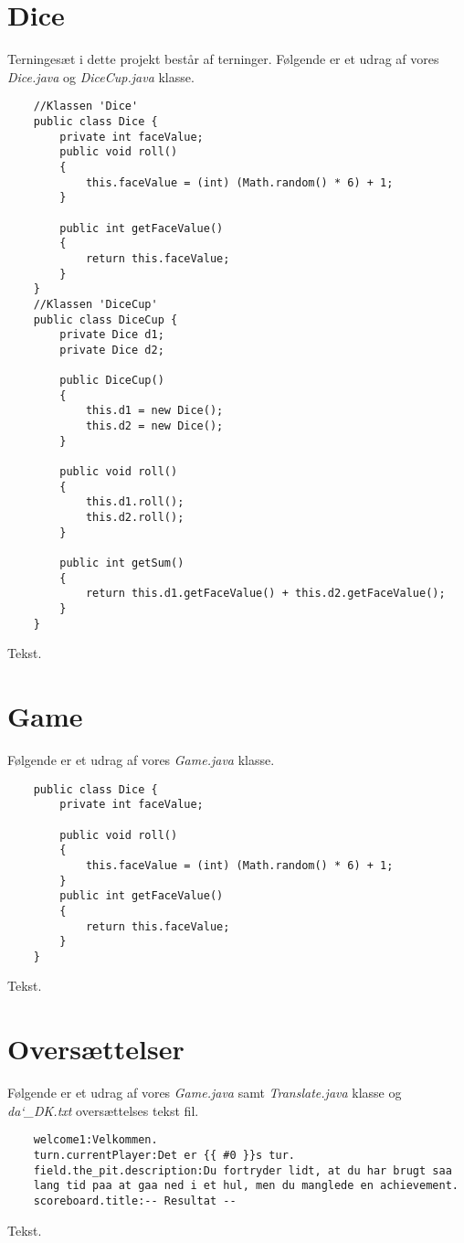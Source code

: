\section{Dice}
\noindent Terningesæt i dette projekt består af terninger. 
Følgende er et udrag af vores \textit{Dice.java} og \textit{DiceCup.java} klasse.\\
\begin{lstlisting}
    //Klassen 'Dice'    
    public class Dice {
        private int faceValue;
        public void roll()
        {
            this.faceValue = (int) (Math.random() * 6) + 1;
        }
    
        public int getFaceValue()
        {
            return this.faceValue;
        }
    }
    //Klassen 'DiceCup'
    public class DiceCup {
        private Dice d1;
        private Dice d2;

        public DiceCup()
        {
            this.d1 = new Dice();
            this.d2 = new Dice();
        }
    
        public void roll()
        {
            this.d1.roll();
            this.d2.roll();
        }
    
        public int getSum()
        {
            return this.d1.getFaceValue() + this.d2.getFaceValue();
        }
    }
\end{lstlisting}
\vspace{2ex}

\noindent Tekst.\\

\section{Game}
\noindent Følgende er et udrag af vores \textit{Game.java} klasse.\\
\begin{lstlisting}
    public class Dice {
        private int faceValue;

        public void roll()
        {
            this.faceValue = (int) (Math.random() * 6) + 1;
        }
        public int getFaceValue()
        {
            return this.faceValue;
        }
    }
\end{lstlisting}
\vspace{2ex}

\noindent Tekst.\\

\section{Oversættelser}
\noindent Følgende er et udrag af vores \textit{Game.java} samt \textit{Translate.java} klasse og \textit{da\char`_DK.txt} oversættelses tekst fil.\\
\begin{lstlisting}
    welcome1:Velkommen.
    turn.currentPlayer:Det er {{ #0 }}s tur.
    field.the_pit.description:Du fortryder lidt, at du har brugt saa
    lang tid paa at gaa ned i et hul, men du manglede en achievement.    
    scoreboard.title:-- Resultat --    
\end{lstlisting}
\vspace{2ex}

\noindent Tekst.\\

